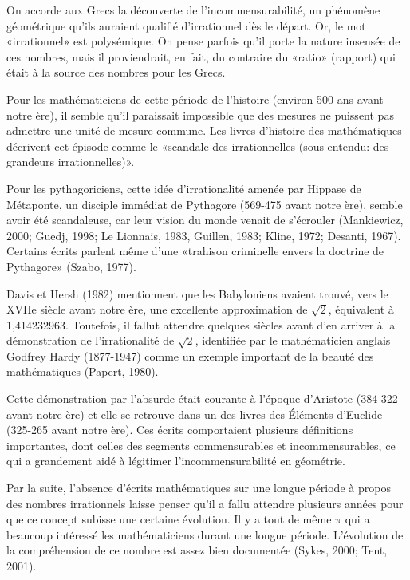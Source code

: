  
\begin{titre}

\end{titre}

 




On accorde aux Grecs la découverte de l’incommensurabilité, un phénomène géométrique qu’ils auraient qualifié d’irrationnel dès le départ. Or, le mot «irrationnel» est polysémique. On pense parfois qu’il porte la nature insensée de ces nombres, mais il proviendrait, en fait, du contraire du «ratio» (rapport) qui était à la source des nombres pour les Grecs. 

Pour les mathématiciens de cette période de l’histoire (environ 500 ans avant notre ère), il  semble  qu’il  paraissait  impossible  que  des  mesures  ne  puissent  pas  admettre  une  unité  de mesure commune. Les livres d’histoire des mathématiques décrivent cet épisode comme le  «scandale  des  irrationnelles  (sous-entendu:  des  grandeurs  irrationnelles)».


Pour les pythagoriciens, cette idée d’irrationalité amenée par Hippase de Métaponte, un disciple immédiat de Pythagore (569-475 avant notre ère), semble avoir été scandaleuse, car leur vision du monde venait de s’écrouler (Mankiewicz, 2000; Guedj, 1998; Le Lionnais,  1983, Guillen,  1983;  Kline,  1972;  Desanti,  1967).  Certains  écrits  parlent  même  d’une  «trahison  criminelle envers la doctrine de Pythagore» (Szabo, 1977).  


Davis et Hersh (1982) mentionnent que les Babyloniens avaient trouvé, vers le XVIIe siècle avant notre ère, une excellente approximation de $\sqrt 2$, équivalent à 1,414232963. Toutefois,  il  fallut  attendre  quelques  siècles  avant  d’en  arriver  à  la  démonstration  de  l’irrationalité  de $\sqrt 2$,  identifiée  par  le  mathématicien  anglais  Godfrey  Hardy  (1877-1947)  comme  un  exemple  important  de  la  beauté  des  mathématiques  (Papert,  1980).  

Cette  démonstration par l’absurde était courante à l’époque d’Aristote (384-322 avant notre ère) et elle se retrouve dans un des livres des Éléments d’Euclide (325-265 avant notre ère). Ces écrits comportaient plusieurs définitions importantes, dont celles des segments commensurables et incommensurables, ce qui a grandement aidé à légitimer l’incommensurabilité en géométrie.

Par  la  suite,  l’absence  d’écrits  mathématiques  sur  une  longue  période  à  propos  des  nombres  irrationnels  laisse  penser  qu’il  a  fallu  attendre  plusieurs  années  pour  que  ce  concept subisse une certaine évolution. Il y a tout de même $\pi$ qui a beaucoup intéressé les mathématiciens durant une longue période. L’évolution de la compréhension de ce nombre est assez bien documentée (Sykes, 2000; Tent, 2001).

